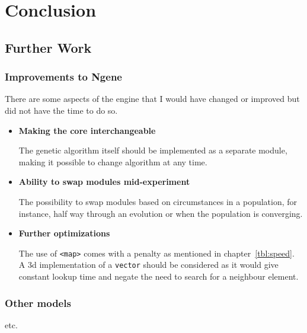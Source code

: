 \section{Conclusion}

\subsection{Further Work}

\subsubsection{Improvements to Ngene}
There are some aspects of the engine that I would have changed or improved but did not have the time to do so.

\begin{itemize}
	\itemsep=0pt
	\item \textbf{Making the core interchangeable}

	The genetic algorithm itself should be implemented as a separate module, making it possible to change algorithm at any time.

	\item \textbf{Ability to swap modules mid-experiment}

	The possibility to swap modules based on circumstances in a population, for instance, half way through an evolution or when the population is converging.

	\item \textbf{Further optimizations}

	 The use of \texttt{<map>} comes with a penalty as mentioned in chapter~\ref{tbl:speed}. A 3d implementation of a \texttt{vector} should be considered as it would give constant lookup time and negate the need to search for a neighbour element.
\end{itemize}

\subsubsection{Other models}

etc.

